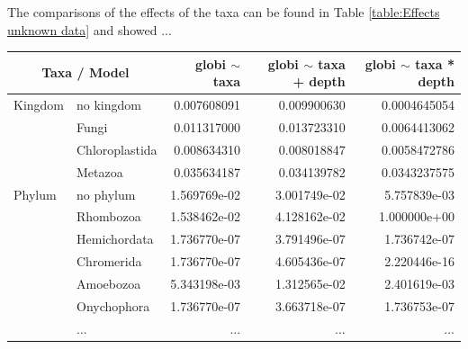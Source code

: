     The comparisons of the effects of the taxa can be found in Table \ref{table:Effects unknown data} 
    and showed ...

    \begin{table}[h!]
      \begin{center}
        \begin{longtable}{ |l|l|r|r|r| }
          \hline
          \multicolumn{2}{|c|}{Taxa / Model} & globi $\sim$ taxa & globi $\sim$ taxa + depth & globi $\sim$ taxa * depth\\
          \hline \hline
          Kingdom & no kingdom  & 0.007608091 & 0.009900630 & 0.0004645054 \\
          & Fungi               & 0.011317000 & 0.013723310 & 0.0064413062 \\
          & Chloroplastida      & 0.008634310 & 0.008018847 & 0.0058472786 \\
          & Metazoa             & 0.035634187 & 0.034139782 & 0.0343237575 \\
          \hline
          Phylum & no phylum    & 1.569769e-02 & 3.001749e-02 & 5.757839e-03 \\
          & Rhombozoa           & 1.538462e-02 & 4.128162e-02 & 1.000000e+00 \\
          & Hemichordata        & 1.736770e-07 & 3.791496e-07 & 1.736742e-07 \\
          & Chromerida          & 1.736770e-07 & 4.605436e-07 & 2.220446e-16 \\
          & Amoebozoa           & 5.343198e-03 & 1.312565e-02 & 2.401619e-03 \\
          & Onychophora         & 1.736770e-07 & 3.663718e-07 & 1.736753e-07 \\
          & ... & ... & ... & ... \\

\end{longtable}
\end{center}
\end{table}

